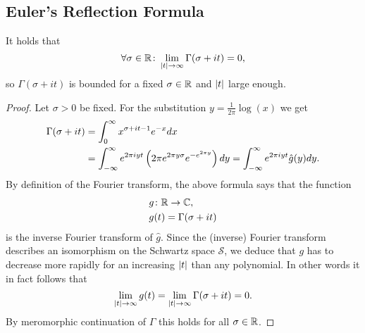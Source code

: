 \subsection{Euler's Reflection Formula}


\begin{lemma}
	It holds that
\begin{equation*}
	\forall \sigma \in \mathbb{R} \colon \lim\limits_{\left|t\right| \to \infty} \Gamma(\sigma + i t) = 0,
\end{equation*}
	so $\Gamma(\sigma + i t)$ is bounded for a fixed $\sigma \in \mathbb{R}$ and $\left|t\right|$ large enough.
\end{lemma}
\begin{proof}
	Let $\sigma >0$ be fixed. For the substitution $y = \frac{1}{2 \pi} \log(x)$ we get
\begin{equation*}
\begin{aligned}	
	\Gamma(\sigma + i t)
	&= \int_0^\infty x^{\sigma + i t - 1} e^{-x} dx \\
	&= \int_{-\infty}^\infty e^{2 \pi i y t} \left(2 \pi e^{2 \pi y \sigma} e^{-e^{2 \pi y}}\right) dy = \int_{-\infty}^\infty e^{2 \pi i y t} \hat{g}(y) dy.
\end{aligned}
\end{equation*}
	By definition of the Fourier transform, the above formula says that the function
\begin{equation*}
\begin{aligned}
	&g\colon \mathbb{R} \to \mathbb{C}, \\
	&g(t) = \Gamma(\sigma + i t)
\end{aligned}
\end{equation*}
	is the inverse Fourier transform of $\hat{g}$. Since the (inverse) Fourier transform describes an isomorphism on the Schwartz space $\mathcal{S}$, we deduce that $g$ has to decrease more rapidly for an increasing $\left|t\right|$ than any polynomial. In other words it in fact follows that
\begin{equation*}
	\lim\limits_{\left|t\right| \to \infty} g(t) = \lim\limits_{\left|t\right| \to \infty} \Gamma(\sigma + i t) = 0.
\end{equation*}
	By meromorphic continuation of $\Gamma$ this holds for all $\sigma \in \mathbb{R}$.
\end{proof}


